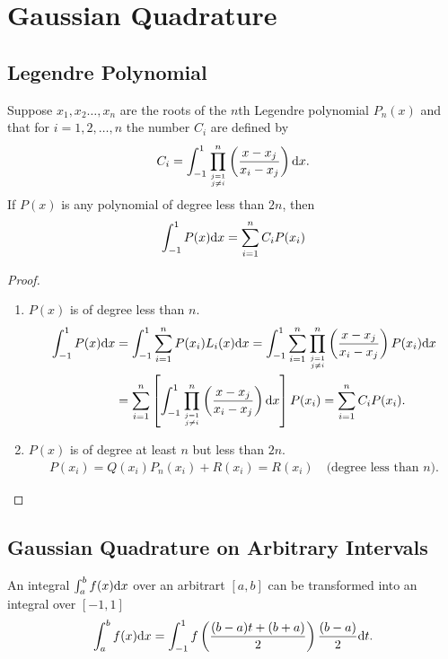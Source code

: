 \section{Gaussian Quadrature}
\subsection{Legendre Polynomial}
\begin{theo}
Suppose $x_1,x_2\ldots,x_n$ are the roots of the $n$th Legendre polynomial $P_n(x)$ and that for $i=1,2,\ldots,n$ the number $C_i$ are defined by
\[
C_i = \int_{-1}^1\prod_{j=1\atop j\neq i}^n\left(\frac{x-x_j}{x_i-x_j}\right)\mathrm{d} x.
\]
If $P(x)$ is any polynomial of degree less than $2n$, then
\[
\int_{-1}^1P(x)\mathrm{d} x = \sum_{i=1}^nC_iP(x_i)
\]
\end{theo}

\begin{proof}
\begin{enumerate}[(1)]
    \item $P(x)$ is of degree less than $n$.
        \begin{align*}
        \int_{-1}^1P(x)\mathrm{d} x &= \int_{-1}^1\sum_{i=1}^{n}P(x_i)L_i(x)\mathrm{d} x = \int_{-1}^1\sum_{i=1}^n\prod_{j=1\atop j\neq i}^n\left(\frac{x-x_j}{x_i-x_j}\right)P(x_i)\mathrm{d} x\\
        &= \sum_{i=1}^n\left[\int_{-1}^1\prod_{j=1\atop j\neq i}^n\left(\frac{x-x_j}{x_i-x_j}\right)\mathrm{d} x\right]P(x_i) = \sum_{i=1}^nC_iP(x_i).
        \end{align*}
    \item $P(x)$ is of degree at least $n$ but less than $2n$.
        \begin{align*}
        P(x_i)=Q(x_i)P_n(x_i)+R(x_i)=R(x_i)\quad\text{(degree less than $n$)}.
        \end{align*}
\end{enumerate}
\end{proof}

\subsection{Gaussian Quadrature on Arbitrary Intervals}
An integral $\int_a^bf(x)\mathrm{d} x$ over an arbitrart $[a,b]$ can be transformed into an integral over $[-1,1]$
\[
\int_a^bf(x)\mathrm{d} x = \int_{-1}^1f\left(\frac{(b-a)t+(b+a)}{2}\right)\frac{(b-a)}{2}\mathrm{d} t.
\]
